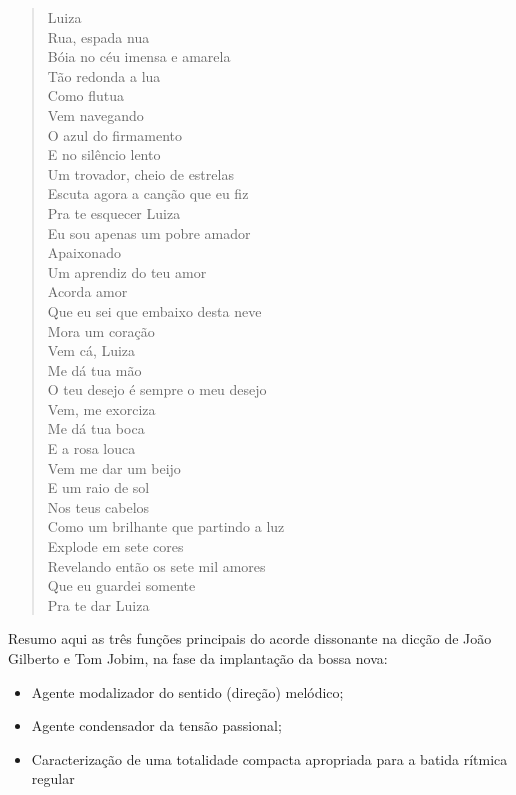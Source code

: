 \begin{verse}
Luiza\\
Rua, espada nua\\
Bóia no céu imensa e amarela\\
Tão redonda a lua\\
Como flutua\\
Vem navegando\\
O azul do firmamento\\
E no silêncio lento\\
Um trovador, cheio de estrelas\\
Escuta agora a canção que eu fiz\\
Pra te esquecer Luiza\\
Eu sou apenas um pobre amador\\
Apaixonado\\
Um aprendiz do teu amor\\
Acorda amor\\
Que eu sei que embaixo desta neve\\
Mora um coração\\
Vem cá, Luiza\\
Me dá tua mão\\
O teu desejo é sempre o meu desejo\\
Vem, me exorciza\\
Me dá tua boca\\
E a rosa louca\\
Vem me dar um beijo\\
E um raio de sol\\
Nos teus cabelos\\
Como um brilhante que partindo a luz\\
Explode em sete cores\\
Revelando então os sete mil amores\\
Que eu guardei somente\\
Pra te dar Luiza
\end{verse}

Resumo aqui as três funções principais do acorde dissonante na dicção de
João Gilberto e Tom Jobim, na fase da implantação da bossa nova:

\begin{itemize}
\item
  Agente modalizador do sentido (direção) melódico;
\item
  Agente condensador da tensão passional;
\item
  Caracterização de uma totalidade compacta apropriada para a batida
  rítmica regular
\end{itemize}

